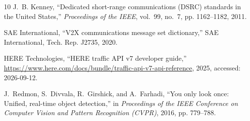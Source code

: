 \documentclass[letterpaper, 10pt, journal, twoside]{IEEEtran}
\begin{document}
\begin{thebibliography}{10}
J.~B. Kenney, ``Dedicated short-range communications ({DSRC}) standards in the United States,'' \emph{Proceedings of the IEEE}, vol.~99, no.~7, pp. 1162--1182, 2011.

{SAE International}, ``{V2X} communications message set dictionary,'' SAE International, Tech. Rep. J2735, 2020.

{HERE Technologies}, ``{HERE} traffic {API} v7 developer guide,'' \url{https://www.here.com/docs/bundle/traffic-api-v7-api-reference}, 2025, accessed: 2026-09-12.

J.~Redmon, S.~Divvala, R.~Girshick, and A.~Farhadi, ``You only look once: Unified, real-time object detection,'' in \emph{Proceedings of the IEEE Conference on Computer Vision and Pattern Recognition (CVPR)}, 2016, pp. 779--788.

\end{thebibliography}
\end{document}
